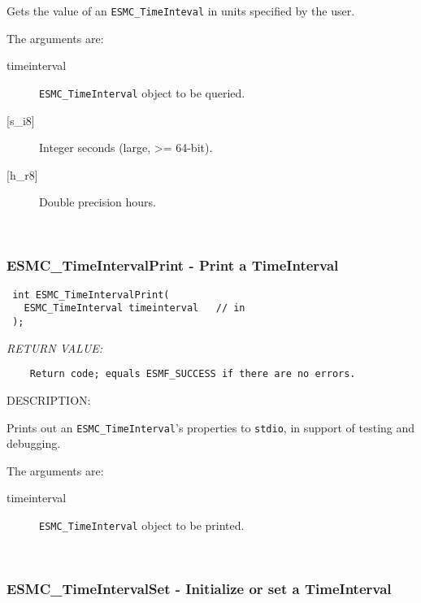   
    Gets the value of an {\tt ESMC\_TimeInteval} in units specified by the user.
  
    The arguments are:
    \begin{description}
    \item[timeinterval]
      {\tt ESMC\_TimeInterval} object to be queried.
    \item[{[s\_i8]}]
      Integer seconds (large, >= 64-bit).
    \item[{[h\_r8]}]
      Double precision hours.
    \end{description}
   
 
\mbox{}\hrulefill\ 
 
\subsubsection [ESMC\_TimeIntervalPrint] {ESMC\_TimeIntervalPrint - Print a TimeInterval}


  
\begin{verbatim} int ESMC_TimeIntervalPrint(
   ESMC_TimeInterval timeinterval   // in
 );
 \end{verbatim}{\em RETURN VALUE:}
\begin{verbatim}    Return code; equals ESMF_SUCCESS if there are no errors.\end{verbatim}
{\sf DESCRIPTION:\\ }


    Prints out an {\tt ESMC\_TimeInterval}'s properties to {\tt stdio}, 
    in support of testing and debugging.
  
    The arguments are:
    \begin{description}
    \item[timeinterval]
      {\tt ESMC\_TimeInterval} object to be printed.
    \end{description}
   
 
\mbox{}\hrulefill\ 
 
\subsubsection [ESMC\_TimeIntervalSet] {ESMC\_TimeIntervalSet - Initialize or set a TimeInterval}


